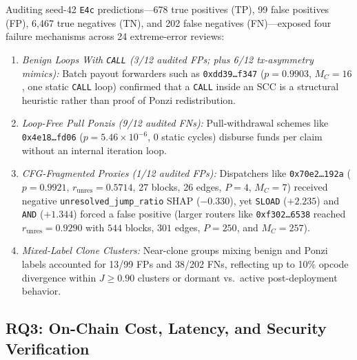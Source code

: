 \documentclass[conference]{IEEEtran}
\begin{document}
Auditing seed-42 \texttt{E4c} predictions---678 true positives (TP), 99 false positives (FP), 6,467 true negatives (TN), and 202 false negatives (FN)---exposed four failure mechanisms across 24 extreme-error reviews:
\begin{enumerate}
\item \emph{Benign Loops With \texttt{CALL} (3/12 audited FPs; plus 6/12 tx-asymmetry mimics):} Batch payout forwarders such as \texttt{0xdd39\ldots f347} ($p=0.9903$, $M_C=16$, one static \texttt{CALL} loop) confirmed that a \texttt{CALL} inside an SCC is a structural heuristic rather than proof of Ponzi redistribution.
\item \emph{Loop-Free Pull Ponzis (9/12 audited FNs):} Pull-withdrawal schemes like \texttt{0x4e18\ldots fd06} ($p=5.46\times 10^{-6}$, 0 static cycles) disburse funds per claim without an internal iteration loop.
\item \emph{CFG-Fragmented Proxies (1/12 audited FPs):} Dispatchers like \texttt{0x70e2\ldots 192a} ($p=0.9921$, $r_{\text{unres}}=0.5714$, 27 blocks, 26 edges, $P=4$, $M_C=7$) received negative \texttt{unresolved\_\allowbreak jump\_\allowbreak ratio} SHAP ($-0.330$), yet \texttt{SLOAD} ($+2.235$) and \texttt{AND} ($+1.344$) forced a false positive (larger routers like \texttt{0xf302\ldots 6538} reached $r_{\text{unres}}=0.9290$ with $544$ blocks, $301$ edges, $P=250$, and $M_C=257$).
\item \emph{Mixed-Label Clone Clusters:} Near-clone groups mixing benign and Ponzi labels accounted for 13/99 FPs and 38/202 FNs, reflecting up to 10\% opcode divergence within $J \ge 0.90$ clusters or dormant vs.\ active post-deployment behavior.
\end{enumerate}

\subsection{RQ3: On-Chain Cost, Latency, and Security Verification}\label{sec:rq3}
\end{document}
